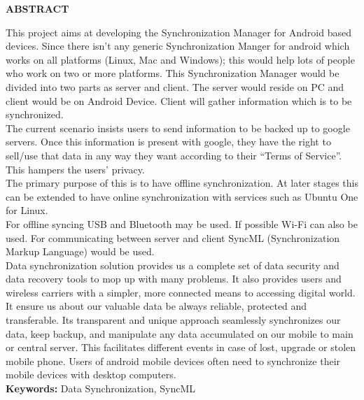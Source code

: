 \begin{center}
\thispagestyle{empty}
\vspace{2cm}
\LARGE{\textbf{ABSTRACT}}\\[1.0cm]
\end{center}
\thispagestyle{empty}
\hspace*{0.82cm}\large{This project aims at developing the Synchronization Manager for Android based devices. 
Since there isn't any generic Synchronization Manger for android which works on all platforms (Linux, Mac and Windows); 
this would help lots of people who work on two or more platforms. This Synchronization Manager would be divided into two 
parts as server and client.  The server would reside on PC and client would be on Android Device. Client will gather 
information which is to be synchronized.\\[0.3cm]}
\hspace*{0.82cm}\large{The current scenario insists users to send information to be backed up to google servers. 
Once this information is present with google, they have the right to sell/use that data in any way they want 
according to their “Terms of Service”. This hampers the users’ privacy.\\[0.3cm]}
\hspace*{0.82cm}\large{The primary purpose of this is to have offline synchronization. 
At later stages this can be extended to have online synchronization with services such as Ubuntu One for Linux.\\[0.3cm]}
\hspace*{0.82cm}\large{For offline syncing USB and Bluetooth may be used. If possible Wi-Fi can also be used. 
For communicating between server and client SyncML (Synchronization Markup Language) would be used.\\[0.3cm]}
\hspace*{0.82cm}\large{Data synchronization solution provides us a complete set of data security and data 
recovery tools to mop up with many problems. It also provides users and wireless carriers with a simpler, 
more connected means to accessing digital world.\\[0.3cm]}
\hspace*{0.82cm}\large{It ensure us about our valuable data be always reliable, protected and transferable. 
Its transparent and unique approach seamlessly synchronizes our data, keep backup, and manipulate any 
data accumulated on our mobile to main or central server. This facilitates different events in case of 
lost, upgrade or stolen mobile phone. Users of android mobile devices often need to synchronize their 
mobile devices with desktop computers.\\[0.3cm]}
\textbf{Keywords: }Data Synchronization, SyncML